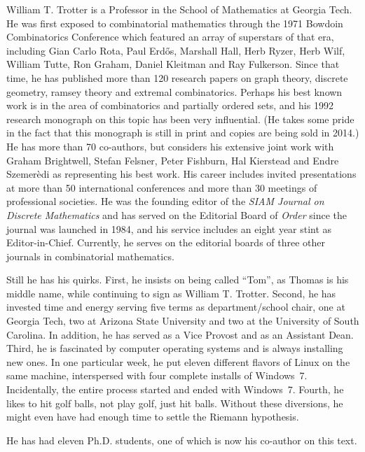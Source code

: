 \medskip
\noindent
William T. Trotter is a Professor in the School of Mathematics at
Georgia Tech.  He was first exposed to combinatorial mathematics through 
the 1971 Bowdoin Combinatorics Conference which featured an array of 
superstars of that era, including Gian Carlo Rota, Paul Erd\H{o}s, 
Marshall Hall, Herb Ryzer, Herb Wilf, William Tutte, Ron Graham, 
Daniel Kleitman and Ray Fulkerson.
Since that time, he has published more than 120 research papers on graph theory,
discrete geometry, ramsey theory and extremal combinatorics.  Perhaps
his best known work is in the area of combinatorics and partially ordered
sets, and his 1992 research monograph on this topic has been very influential.
(He takes some pride in the fact that this monograph is still in print
and copies are being sold in 2014.) He has more than 70 co-authors, but
considers his extensive joint work with Graham Brightwell, 
Stefan Felsner, Peter Fishburn, Hal Kierstead and Endre Szemer\`{e}di 
as representing his best work.  His career includes invited 
presentations at more than 50 international conferences
and more than 30 meetings of professional societies.  He was the founding
editor of the \textit{SIAM Journal on Discrete Mathematics} and has served on
the Editorial Board of \textit{Order} since the journal was launched
in 1984, and his service includes an eight year stint as Editor-in-Chief.  Currently,
he serves on the editorial boards of three other journals in combinatorial
mathematics.

Still he has his quirks. First, he insists on being called ``Tom'',
as Thomas is his middle name, while continuing to sign as William T. Trotter.
Second, he has invested time and energy serving five terms as department/school
chair, one at Georgia Tech, two at Arizona State University and two at
the University of South Carolina.  In addition, he has served as
a Vice Provost and as an Assistant Dean.  Third, he is fascinated by
computer operating systems and is always installing new ones.  In one
particular week, he put eleven different flavors of Linux on the
same machine, interspersed with four complete installs of Windows~7.
Incidentally, the entire process started and ended with Windows~7.  Fourth, he
likes to hit golf balls, not play golf, just hit balls.  Without these
diversions, he might even have had enough time to settle the Riemann hypothesis.

He has had eleven Ph.D. students, one of which is now his co-author on this
text.


